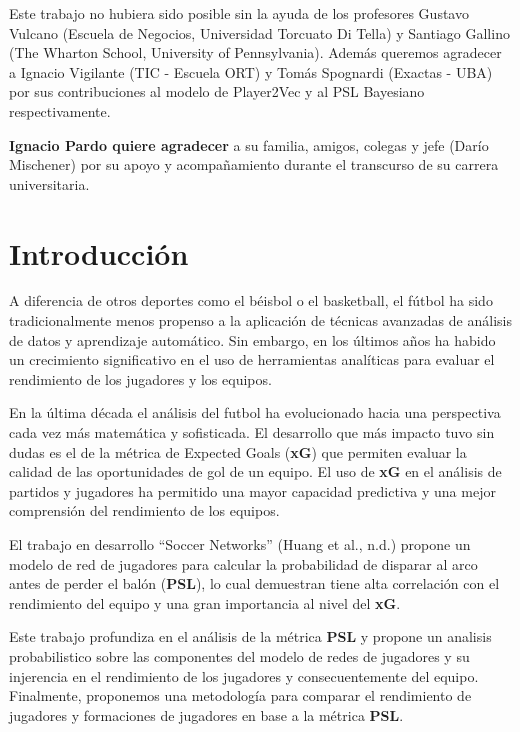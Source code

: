 \documentclass[
  a4paper,
]{article}
\begin{document}
Este trabajo no hubiera sido posible sin la ayuda de los profesores
Gustavo Vulcano (Escuela de Negocios, Universidad Torcuato Di Tella) y
Santiago Gallino (The Wharton School, University of Pennsylvania).
Además queremos agradecer a Ignacio Vigilante (TIC - Escuela ORT) y
Tomás Spognardi (Exactas - UBA) por sus contribuciones al modelo de
Player2Vec y al PSL Bayesiano respectivamente.

\textbf{Ignacio Pardo quiere agradecer} a su familia, amigos, colegas y
jefe (Darío Mischener) por su apoyo y acompañamiento durante el
transcurso de su carrera universitaria.

\hypertarget{introducciuxf3n}{%
\section{\texorpdfstring{\textbf{Introducción}}{Introducción}}\label{introducciuxf3n}}

A diferencia de otros deportes como el béisbol o el basketball, el
fútbol ha sido tradicionalmente menos propenso a la aplicación de
técnicas avanzadas de análisis de datos y aprendizaje automático. Sin
embargo, en los últimos años ha habido un crecimiento significativo en
el uso de herramientas analíticas para evaluar el rendimiento de los
jugadores y los equipos.

En la última década el análisis del futbol ha evolucionado hacia una
perspectiva cada vez más matemática y sofisticada. El desarrollo que más
impacto tuvo sin dudas es el de la métrica de Expected Goals
(\textbf{xG}) que permiten evaluar la calidad de las oportunidades de
gol de un equipo. El uso de \textbf{xG} en el análisis de partidos y
jugadores ha permitido una mayor capacidad predictiva y una mejor
comprensión del rendimiento de los equipos.

El trabajo en desarrollo ``Soccer Networks'' (Huang et al., n.d.)
propone un modelo de red de jugadores para calcular la probabilidad de
disparar al arco antes de perder el balón (\textbf{PSL}), lo cual
demuestran tiene alta correlación con el rendimiento del equipo y una
gran importancia al nivel del \textbf{xG}.

Este trabajo profundiza en el análisis de la métrica \textbf{PSL} y
propone un analisis probabilistico sobre las componentes del modelo de
redes de jugadores y su injerencia en el rendimiento de los jugadores y
consecuentemente del equipo. Finalmente, proponemos una metodología para
comparar el rendimiento de jugadores y formaciones de jugadores en base
a la métrica \textbf{PSL}.
\end{document}
